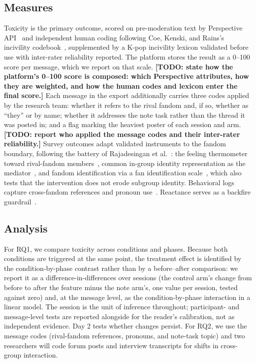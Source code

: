 \documentclass[manuscript,screen,review,anonymous]{acmart}
\newcommand{\todonote}[1]{\textcolor{orange!80!black}{\textbf{[TODO: #1]}}}
\begin{document}
\subsection{Measures}

Toxicity is the primary outcome, scored on pre-moderation text by Perspective
API~\cite{lees2022} and independent human coding following Coe, Kenski, and
Rains's incivility codebook~\cite{coe2014}, supplemented by a K-pop
incivility lexicon validated before use with inter-rater reliability
reported. The platform stores the result as a 0--100 score per message, which
we report on that scale. \todonote{state how the platform's 0--100 score is
composed: which Perspective attributes, how they are weighted, and how the
human codes and lexicon enter the final score.} Each message in the export
additionally carries three codes applied by the research team: whether it
refers to the rival fandom and, if so, whether as ``they'' or by name;
whether it addresses the note task rather than the thread it was posted in;
and a flag marking the heaviest poster of each session and arm.
\todonote{report who applied the message codes and their inter-rater
reliability.} Survey outcomes adapt validated instruments to the fandom
boundary, following the battery of Rajadesingan et
al.~\cite{rajadesingan2020}: the feeling thermometer toward rival-fandom
members~\cite{iyengar2012}, common in-group identity representation as the
mediator~\cite{gaertner2000}, and fandom identification via a fan
identification scale~\cite{wann1993}, which also tests that the intervention
does not erode subgroup identity. Behavioral logs capture cross-fandom
references and pronoun use~\cite{pennebaker2011}. Reactance serves as a
backfire guardrail~\cite{brehm1966}.

\subsection{Analysis}

For RQ1, we compare toxicity across conditions and phases. Because both
conditions are triggered at the same point, the treatment effect is
identified by the condition-by-phase contrast rather than by a before--after
comparison: we report it as a difference-in-differences over sessions (the
control arm's change from before to after the feature minus the note arm's,
one value per session, tested against zero) and, at the message level, as
the condition-by-phase interaction in a linear model. The session is the
unit of inference throughout; participant- and message-level tests are
reported alongside for the reader's calibration, not as independent
evidence. Day 2 tests whether changes persist. For RQ2, we use the message
codes (rival-fandom references, pronouns, and note-task topic) and two
researchers will code forum posts and interview transcripts for shifts in
cross-group interaction.
\end{document}
